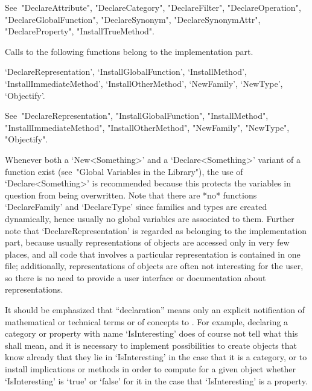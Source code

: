 See~"DeclareAttribute",
"DeclareCategory",
"DeclareFilter",
"DeclareOperation",
"DeclareGlobalFunction",
"DeclareSynonym",
"DeclareSynonymAttr",
"DeclareProperty",
"InstallTrueMethod".

Calls to the following functions belong to the implementation part.

`DeclareRepresentation',
`InstallGlobalFunction',
`InstallMethod',
`InstallImmediateMethod',
`InstallOtherMethod',
`NewFamily',
`NewType',
`Objectify'.

See~"DeclareRepresentation",
"InstallGlobalFunction",
"InstallMethod",
"InstallImmediateMethod",
"InstallOtherMethod",
"NewFamily",
"NewType",
"Objectify".

Whenever both a `New<Something>' and a `Declare<Something>' variant
of a function exist (see~"Global Variables in the Library"),
the use of `Declare<Something>' is recommended
because this protects the variables in question from being overwritten.
Note that there are *no* functions `DeclareFamily' and `DeclareType'
since families and types are created dynamically,
hence usually no global variables are associated to them.
Further note that `DeclareRepresentation' is regarded as belonging to the
implementation part,
because usually representations of objects are accessed only in very
few places, and all code that involves a particular representation
is contained in one file;
additionally, representations of objects are often not interesting
for the user, so there is no need to provide a user interface
or documentation about representations.

It should be emphasized that ``declaration'' means only an explicit
notification of mathematical or technical terms or of concepts to {\GAP}.
For example, declaring a category or property with name `IsInteresting'
does of course not tell {\GAP} what this shall mean,
and it is necessary to implement possibilities to create objects that
know already that they lie in `IsInteresting' in the case that it is a
category, or to install implications or methods in order to
compute for a given object whether `IsInteresting' is `true' or `false'
for it in the case that `IsInteresting' is a property.



